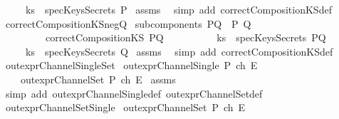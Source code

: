 \begin{isabellebody}
\ \ \ \ \ {\isachardoublequoteopen}ks\ {\isasymnotin}\ specKeysSecrets\ P{\isachardoublequoteclose}\isanewline
%
\isadelimproof
%
\endisadelimproof
%
\isatagproof
{}\isamarkupfalse%
\ assms\ \isamarkupfalse%
\ {\isacharparenleft}simp\ add{\isacharcolon}\ correctCompositionKS{\isacharunderscore}def{\isacharparenright}%
\endisatagproof
{\isafoldproof}%
%
\isadelimproof
\isanewline
%
\endisadelimproof
\isanewline
{}\isamarkupfalse%
\ correctCompositionKS{\isacharunderscore}negQ{\isacharcolon}\isanewline
{}\ {\isachardoublequoteopen}subcomponents\ PQ\ {\isacharequal}\ {\isacharbraceleft}P{\isacharcomma}\ Q{\isacharbraceright}{\isachardoublequoteclose}\isanewline
\ \ \ \ \ \ \ \ \ {\isachardoublequoteopen}correctCompositionKS\ PQ{\isachardoublequoteclose}\ \isanewline
\ \ \ \ \ \ \ \ \ {\isachardoublequoteopen}ks\ {\isasymnotin}\ specKeysSecrets\ PQ{\isachardoublequoteclose}\ \isanewline
{}\ \ \ \ \ {\isachardoublequoteopen}ks\ {\isasymnotin}\ specKeysSecrets\ Q{\isachardoublequoteclose}\isanewline
%
\isadelimproof
%
\endisadelimproof
%
\isatagproof
{}\isamarkupfalse%
\ assms\ \isamarkupfalse%
\ {\isacharparenleft}simp\ add{\isacharcolon}\ correctCompositionKS{\isacharunderscore}def{\isacharparenright}%
\endisatagproof
{\isafoldproof}%
%
\isadelimproof
\isanewline
%
\endisadelimproof
\isanewline
{}\isamarkupfalse%
\ out{\isacharunderscore}exprChannelSingle{\isacharunderscore}Set{\isacharcolon}\isanewline
{}\ {\isachardoublequoteopen}out{\isacharunderscore}exprChannelSingle\ P\ ch\ E{\isachardoublequoteclose}\isanewline
{}\ \ \ \ {\isachardoublequoteopen}out{\isacharunderscore}exprChannelSet\ P\ {\isacharbraceleft}ch{\isacharbraceright}\ E{\isachardoublequoteclose}\isanewline
%
\isadelimproof
%
\endisadelimproof
%
\isatagproof
{}\isamarkupfalse%
\ assms\ \isanewline
{}\isamarkupfalse%
\ {\isacharparenleft}simp\ add{\isacharcolon}\ out{\isacharunderscore}exprChannelSingle{\isacharunderscore}def\ out{\isacharunderscore}exprChannelSet{\isacharunderscore}def{\isacharparenright}%
\endisatagproof
{\isafoldproof}%
%
\isadelimproof
\isanewline
%
\endisadelimproof
\isanewline
{}\isamarkupfalse%
\ out{\isacharunderscore}exprChannelSet{\isacharunderscore}Single{\isacharcolon}\isanewline
{}\ {\isachardoublequoteopen}out{\isacharunderscore}exprChannelSet\ P\ {\isacharbraceleft}ch{\isacharbraceright}\ E{\isachardoublequoteclose}\isanewline

\end{isabellebody}
